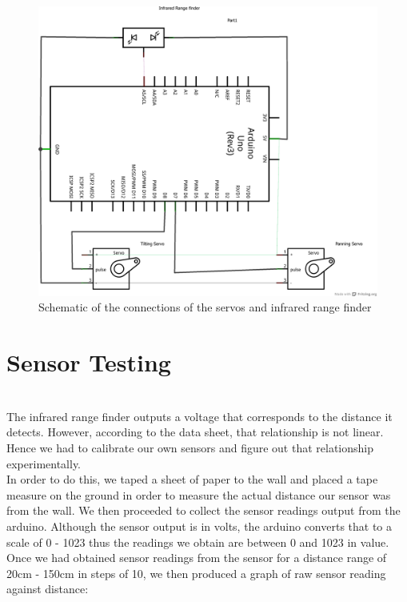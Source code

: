 \documentclass{article}
\begin{document}
\begin{figure}[h!]
\begin{center}
\includegraphics[scale=0.4, angle=90]{schematic.png}
\caption{Schematic of the connections of the servos and infrared range finder}
\end{center}
\end{figure}

\section{Sensor Testing} \ \\
The infrared range finder outputs a voltage that corresponds to the distance it detects. However, according to the data sheet, that relationship is not linear. Hence we had to calibrate our own sensors and figure out that relationship experimentally. \\

In order to do this, we taped a sheet of paper to the wall and placed a tape measure on the ground in order to measure the actual distance our sensor was from the wall. We then proceeded to collect the sensor readings output from the arduino. Although the sensor output is in volts, the arduino converts that to a scale of 0 - 1023 thus the readings we obtain are between 0 and 1023 in value. \\

Once we had obtained sensor readings from the sensor for a distance range of 20cm - 150cm in steps of 10, we then produced a graph of raw sensor reading against distance:
\end{document}
